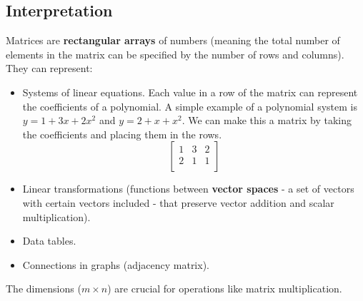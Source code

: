 \documentclass{article}
\begin{document}
\subsection*{Interpretation}
Matrices are \textbf{rectangular arrays} of numbers (meaning the total number of elements in the matrix can be specified by the number of rows and columns). They can represent:
\begin{itemize}
    \item Systems of linear equations. Each value in a row of the matrix can represent the coefficients of a polynomial. A simple example of a polynomial system is $y=1+3x+2x^{2}$ and $y=2+x+x^{2}$. We can make this a matrix by taking the coefficients and placing them in the rows.
    \[ \begin{bmatrix}
        1 & 3 & 2 \\
        2 & 1 & 1 \\
    \end{bmatrix} \]
    
    \item Linear transformations (functions between \textbf{vector spaces} - a set of vectors with certain vectors included -  that preserve vector addition and scalar multiplication).
    \item Data tables.
    \item Connections in graphs (adjacency matrix).
\end{itemize}
The dimensions ($m \times n$) are crucial for operations like matrix multiplication.
\end{document}
